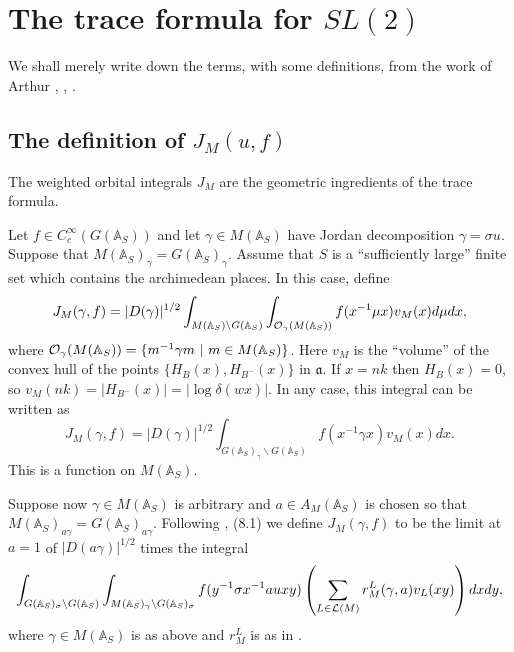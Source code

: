 \documentclass[12pt,letterpaper,openany]{book}
\theoremstyle{plain}
\theoremstyle{definition}
\theoremstyle{remark}
\theoremstyle{remark}
\begin{document}
\section{The trace formula for \texorpdfstring{$SL(2)$}{SL(2)}}

We shall merely write down the terms, with some definitions, from the
work of Arthur \cite{A2}, \cite{A3}, \cite{A7}.

\subsection{The definition of \texorpdfstring{$J_M(u,f)$}{J\_M(u,f)}}

The weighted orbital integrals $J_M$ are the geometric ingredients of the trace formula.


Let $f\in C_c^\infty (G({\mathbb {A}}_S))$ and let
$\gamma \in M({\mathbb {A}}_S)$ have Jordan decomposition
$\gamma =\sigma u$. Suppose that
$M({\mathbb {A}}_S)_\gamma =G({\mathbb {A}}_S)_\gamma $.
Assume that $S$ is a ``sufficiently large'' finite set which contains
the archimedean places. In this case, define
\begin{equation}
J_M(\gamma ,f)=|D(\gamma )|^{1/2}
\int_{M({\mathbb {A}}_S)\backslash G({\mathbb {A}}_S)}
\int_{{\cal O}_\gamma (M({\mathbb {A}}_S))}f(x^{-1}\mu x)v_M(x)d\mu dx,
\end{equation}
where ${\cal O}_\gamma (M({\mathbb {A}}_S))
=\{m^{-1}\gamma m\ |\ m\in M({\mathbb {A}}_S)\}$.
Here $v_M$ is the ``volume'' of the convex hull of the points
$\{H_B(x),H_{B^{-}}(x)\}$ in ${\mathfrak a}$. If $x=nk$ then
$H_B(x)=0$, so $v_M(nk)=|H_{B^{-}}(x)|=|\log\delta (wx)|$.
In any case, this integral can be written as
\[
J_M(\gamma ,f)=|D(\gamma )|^{1/2}
\int_{G({\mathbb {A}}_S)_\gamma \backslash G({\mathbb{A}}_S)}
f(x^{-1}\gamma x)v_M(x)dx.
\]
This is a function on $M({\mathbb {A}}_S)$.

Suppose now $\gamma \in M({\mathbb {A}}_S)$ is arbitrary and $a\in
A_M({\mathbb {A}}_S)$ is chosen so that
$M({\mathbb {A}}_S)_{a\gamma }=G({\mathbb {A}}_S)_{a\gamma }$.
Following \cite{A7}, (8.1)
we define $J_M(\gamma ,f)$ to be the limit at $a=1$
of $|D(a\gamma )|^{1/2}$ times the integral
\begin{equation}
\int_{G({\mathbb {A}}_S)_\sigma \backslash G({\mathbb {A}}_S)}
\int_{M({\mathbb {A}}_S)_\gamma \backslash G({\mathbb {A}}_S)_\sigma }
f(y^{-1}\sigma x^{-1}a u xy) \left( \sum_{L\in {\cal L}(M)}r_M^L(\gamma
,a)v_L(xy)\right) dxdy,
\end{equation}
where $\gamma\in M({\mathbb A}_S)$ is as above and $r_M^L$ is as in \cite{A7}.
\end{document}
